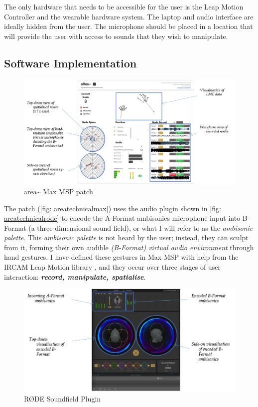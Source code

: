 The only hardware that needs to be accessible for the user is the Leap Motion Controller and the wearable hardware system. The laptop and audio interface are ideally hidden from the user. The microphone should be placed in a location that will provide the user with access to sounds that they wish to manipulate.

\subsection{Software Implementation}            \label{sec: area-system-software}
\begin{figure}
    \centering
    \includegraphics[width=\linewidth]{figures/c_5/areatechnical_max.png}
    \caption{area\textasciitilde{} Max MSP patch}
    \label{fig: areatechnicalmax}
\end{figure}
The patch (\autoref{fig: areatechnicalmax}) uses the audio plugin \citep{rode2020} shown in \autoref{fig: areatechnicalrode} to encode the A-Format ambisonics microphone input into B-Format (a three-dimensional sound field), or what I will refer to as the \textit{ambisonic palette}. This \textit{ambisonic palette} is not heard by the user; instead, they can sculpt from it, forming their own audible \textit{(B-Format) virtual audio environment} through hand gestures. I have defined these gestures in Max MSP with help from the IRCAM Leap Motion library \citeyearpar{ircam2014}, and they occur over three stages of user interaction: \textit{\textbf{record, manipulate, spatialise}}. 
\begin{figure}
    \centering
    \includegraphics[width=\linewidth]{figures/c_5/areatechnical_rode.png}
    \caption{RØDE Soundfield Plugin}
    \label{fig: areatechnicalrode}
\end{figure}

